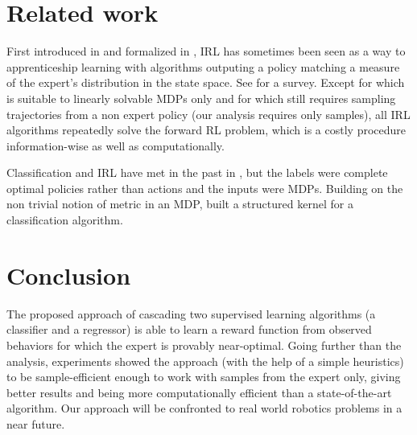 \documentclass[11pt]{article}
\newcommand{\0}{\mathbf{0}}
\newcommand{\1}{\mathbf{1}}
\begin{document}
\section{Related work}
\label{sec-6}

\label{section: related work}

First introduced in \cite{russell1998learning} and formalized in \cite{ng2000algorithms}, IRL has sometimes been seen as a way to apprenticeship learning \cite{abbeel2004apprenticeship} with algorithms outputing a policy matching a measure of the expert's distribution in the state space. See \cite{neu2009training} for a survey. Except for \cite{dvijotham2010inverse} which is suitable to linearly solvable MDPs only and for \cite{boularias2011relative} which still requires sampling trajectories from a non expert policy (our analysis requires only samples), all IRL algorithms repeatedly solve the forward RL problem, which is a costly procedure information-wise as well as computationally.

Classification and IRL have met in the past in \cite{ratliff2006maximum}, but the labels were complete optimal policies rather than actions and the inputs were MDPs. Building on the non trivial notion of metric in an MDP, \cite{melo2010learning} built a structured kernel for a classification algorithm.
\section{Conclusion}
\label{sec-7}

  
  The proposed approach of cascading two supervised learning algorithms (a classifier and a regressor) is able to learn a reward function from observed behaviors for which the expert is provably near-optimal. Going further than the analysis, experiments showed the approach (with the help of a simple heuristics) to be sample-efficient enough to work with samples from the expert only, giving better results and being more computationally efficient than a state-of-the-art algorithm. Our approach will be confronted to real world robotics problems in a near future.



\end{document}
